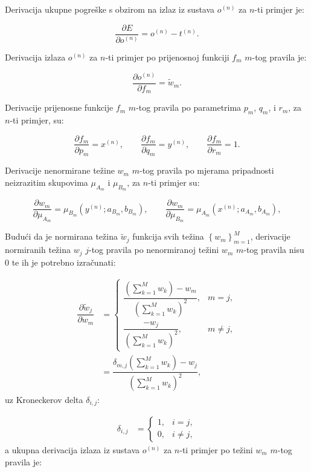 \documentclass[12pt, a4paper]{article}
\begin{document}
Derivacija ukupne pogreške s obzirom na izlaz iz sustava $o^{(n)}$ za $n$-ti primjer je:

$$ \dfrac{\partial E}{\partial o^{(n)}} = o^{(n)} - t^{(n)}. $$

Derivacija izlaza $o^{(n)}$ za $n$-ti primjer po prijenosnoj funkciji $f_m$ $m$-tog pravila je:

$$ \dfrac{\partial o^{(n)}}{\partial f_m} = \widetilde{w}_m. $$

Derivacije prijenosne funkcije $f_m$ $m$-tog pravila po parametrima $p_m$, $q_m$, i $r_m$, za $n$-ti primjer, su:

$$
  \dfrac{\partial f_m}{\partial p_m} = x^{(n)}, \qquad
  \dfrac{\partial f_m}{\partial q_m} = y^{(n)}, \qquad
  \dfrac{\partial f_m}{\partial r_m} = 1.
$$

Derivacije nenormirane težine $w_m$ $m$-tog pravila po mjerama pripadnosti neizrazitim skupovima $\mu_{A_m}$ i $\mu_{B_m}$, za $n$-ti primjer su:

$$
  \dfrac{\partial w_m}{\partial \mu_{A_m}}
  = \mu_{B_m} \left( y^{(n)}; a_{B_m}, b_{B_m} \right), \qquad
  \dfrac{\partial w_m}{\partial \mu_{B_m}}
  = \mu_{A_m} \left( x^{(n)}; a_{A_m}, b_{A_m} \right),
$$

Budući da je normirana težina $\widetilde{w}_j$ funkcija svih težina $\left\{ w_m \right\}_{m=1}^{M}$, derivacije normiranih težina $w_j$ $j$-tog pravila po nenormiranoj težini $w_m$ $m$-tog pravila nisu 0 te ih je potrebno izračunati:

\begin{align*}
  \dfrac{\partial \widetilde{w}_j}{\partial w_{m}} &= \begin{cases}
    \dfrac{\left(\sum_{k=1}^{M} w_k \right) - w_m}{\left( \sum_{k=1}^{M} w_k \right)^2}, & m = j, \\
    \dfrac{-w_j}{\left( \sum_{k=1}^{M} w_k \right)^2}, & m \ne j,
  \end{cases} \\
  &= \dfrac{\delta_{m, j} \left(\sum_{k=1}^{M} w_k \right) - w_j}{\left( \sum_{k=1}^{M} w_k \right)^2},
\end{align*}
uz Kroneckerov delta $\delta_{i, j}$:

\begin{align*}
  \delta_{i, j} &= \begin{cases}
    1, & i = j, \\
    0, & i \ne j,
\end{cases}
\end{align*}
a ukupna derivacija izlaza iz sustava $o^{(n)}$ za $n$-ti primjer po težini $w_m$ $m$-tog pravila je:
\end{document}
